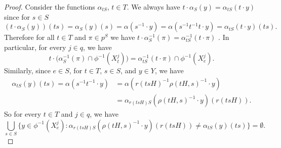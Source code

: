 \documentclass[12pt]{amsart}
\theoremstyle{definition}
\begin{document}
\begin{proof}
	Consider the functions $\alpha_{t S}$, $t \in T$. We always have $t \cdot \alpha_S(y) = \alpha_{t S}(t \cdot y)$ since for $s \in S$
	$$(t \cdot \alpha_S(y))(t s) = \alpha_S(y)(s) = \alpha(s^{-1} \cdot y) = \alpha(s^{-1} t^{-1} t \cdot y) = \alpha_{t S}(t \cdot y)(t s).$$
	Therefore for all $t \in T$ and $\pi \in p^S$ we have $t \cdot \alpha_S^{-1}(\pi) = \alpha_{t S}^{-1}(t \cdot \pi)$ . 
    In particular, for every $j \in q$, we have
	\begin{equation} \label{eqn:md_ec1}
		t \cdot \Big( \alpha_S^{-1}(\pi) \cap \phi^{-1}(X_t^j) \Big) = \alpha_{t S}^{-1}(t \cdot \pi) \cap \phi^{-1}(X_{e}^j).
	\end{equation}
	Similarly, since $e \in S$, for $t \in T$, $s \in S$, and $y \in Y$, we have
	\begin{align*}
		\alpha_{t S}(y)(t s) = \alpha(s^{-1} t^{-1} \cdot y) & = \alpha(r(t s H)^{-1} \rho(t H, s)^{-1} \cdot y)\\
		& = \alpha_{r(t s H) S}(\rho(t H, s)^{-1} \cdot y)(r(t s H)).
	\end{align*}
	So for every $t \in T$ and $j \in q$, we have
	\begin{equation} \label{eqn:md_ec2}
		\bigcup_{s \in S} \{y \in \phi^{-1}(X_{e}^j): \alpha_{r(t s H) S}(\rho(t H, s)^{-1} \cdot y)(r(t s H)) \neq \alpha_{t S}(y)(t s)\} = \emptyset.
	\end{equation}
	

\end{proof}
\end{document}
